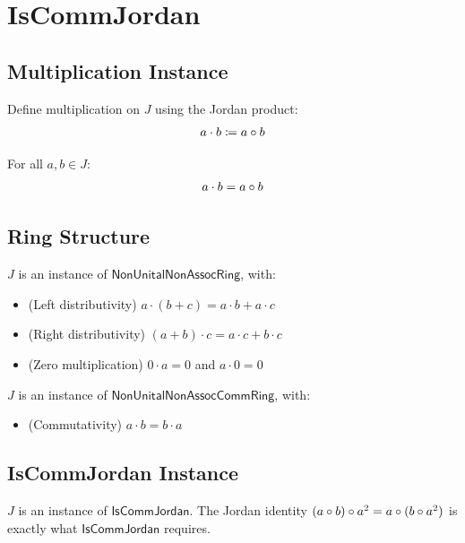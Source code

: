\section{IsCommJordan}

\subsection{Multiplication Instance}

\begin{definition}[instMul]
Define multiplication on $J$ using the Jordan product:
\[ a \cdot b \coloneqq a \circ b \]
\end{definition}

\begin{lemma}
For all $a, b \in J$:
\[ a \cdot b = a \circ b \]
\end{lemma}

\subsection{Ring Structure}

\begin{proposition}[instNonUnitalNonAssocRing]
$J$ is an instance of $\mathsf{NonUnitalNonAssocRing}$, with:
\begin{itemize}
  \item (Left distributivity) $a \cdot (b + c) = a \cdot b + a \cdot c$
  \item (Right distributivity) $(a + b) \cdot c = a \cdot c + b \cdot c$
  \item (Zero multiplication) $0 \cdot a = 0$ and $a \cdot 0 = 0$
\end{itemize}
\end{proposition}

\begin{proposition}[instNonUnitalNonAssocCommRing]
$J$ is an instance of $\mathsf{NonUnitalNonAssocCommRing}$, with:
\begin{itemize}
  \item (Commutativity) $a \cdot b = b \cdot a$
\end{itemize}
\end{proposition}

\subsection{IsCommJordan Instance}

\begin{proposition}[instIsCommJordan]
$J$ is an instance of $\mathsf{IsCommJordan}$. The Jordan identity $(a \circ b) \circ a^2 = a \circ (b \circ a^2)$ is exactly what $\mathsf{IsCommJordan}$ requires.
\end{proposition}

